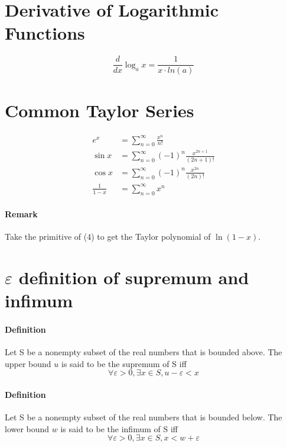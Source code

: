 \documentclass[11pt]{article}
\begin{document}
\section{Derivative of Logarithmic Functions}
$$\frac{d}{dx}\log_a{x} = \frac{1}{x \cdot ln(a)}$$

\section{Common Taylor Series}
\begin{align}
	e^x &= \sum_{n=0}^{\infty}\frac{x^n}{n!}\\
	\sin{x} &= \sum_{n=0}^{\infty}(-1)^n\frac{x^{2n+1}}{(2n+1)!}\\
	\cos{x} &= \sum_{n=0}^{\infty}(-1)^n\frac{x^{2n}}{(2n)!}\\
	\frac{1}{1-x} &= \sum_{n=0}^{\infty}x^n
\end{align}
\paragraph{Remark}
Take the primitive of (4) to get the Taylor polynomial of $\ln(1-x)$.
\section{$\varepsilon$ definition of supremum and infimum}
\paragraph{Definition} Let S be a nonempty subset of the real numbers that is bounded above. The upper bound $u$ is said to be the supremum of S iff $$\forall \varepsilon >0, \exists x \in S, u - \varepsilon < x$$
\paragraph{Definition} Let S be a nonempty subset of the real numbers that is bounded below. The lower bound $w$ is said to be the infimum of S iff $$\forall \varepsilon >0, \exists x \in S, x < w + \varepsilon$$
\end{document}
